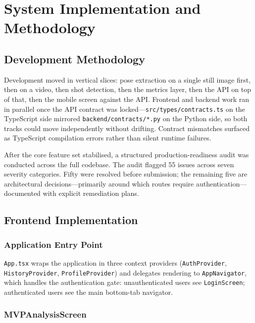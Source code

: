 \chapter{System Implementation and Methodology}
\label{chap:implementation}

\section{Development Methodology}
\label{sec:methodology}

Development moved in vertical slices: pose extraction on a single still image first, then on a video, then shot detection, then the metrics layer, then the API on top of that, then the mobile screen against the API. Frontend and backend work ran in parallel once the API contract was locked---\lstinline|src/types/contracts.ts| on the TypeScript side mirrored \lstinline|backend/contracts/*.py| on the Python side, so both tracks could move independently without drifting. Contract mismatches surfaced as TypeScript compilation errors rather than silent runtime failures.

After the core feature set stabilised, a structured production-readiness audit was conducted across the full codebase. The audit flagged 55 issues across seven severity categories. Fifty were resolved before submission; the remaining five are architectural decisions---primarily around which routes require authentication---documented with explicit remediation plans.

\section{Frontend Implementation}
\label{sec:frontend_impl}

\subsection{Application Entry Point}

\lstinline|App.tsx| wraps the application in three context providers (\lstinline|AuthProvider|, \lstinline|HistoryProvider|, \lstinline|ProfileProvider|) and delegates rendering to \lstinline|AppNavigator|, which handles the authentication gate: unauthenticated users see \lstinline|LoginScreen|; authenticated users see the main bottom-tab navigator.

\subsection{MVPAnalysisScreen}

